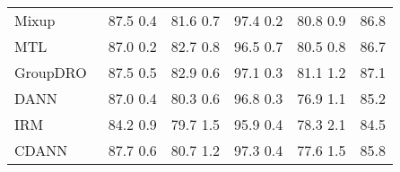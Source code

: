 \documentclass[10pt,twocolumn,letterpaper]{article}
\begin{document}
\begin{table*}[ht]
\begin{center}
{\begin{tabular}{lccccc}
Mixup~\cite{yan2020improve}                & 87.5  0.4       & 81.6  0.7       & 97.4  0.2       & 80.8  0.9       & 86.8                 \\
MTL~\cite{blanchard2017domain}                  & 87.0  0.2       & 82.7  0.8       & 96.5  0.7       & 80.5  0.8       & 86.7                 \\
GroupDRO~\cite{sagawa2019distributionally}             & 87.5  0.5       & 82.9  0.6       & 97.1  0.3       & 81.1  1.2       & 87.1                 \\
DANN~\cite{ganin2016domain}                 & 87.0  0.4       & 80.3  0.6       & 96.8  0.3       & 76.9  1.1       & 85.2                 \\
IRM~\cite{arjovsky2019invariant}                  & 84.2  0.9       & 79.7  1.5       & 95.9  0.4       & 78.3  2.1       & 84.5                 \\
CDANN~\cite{li2018deep}                & 87.7  0.6       & 80.7  1.2       & 97.3  0.4       & 77.6  1.5       & 85.8                 \\
\bottomrule
\end{tabular}}
\end{center}
\end{table*}

\begin{table*}[ht]
\begin{center}
\caption{Detailed scores on OfficeHome~\cite{venkateswara2017deep} in DomainBed~\cite{gulrajani2020search}. 
}\label{sup:db_officehome}
\end{center}
\end{table*}
\end{document}
